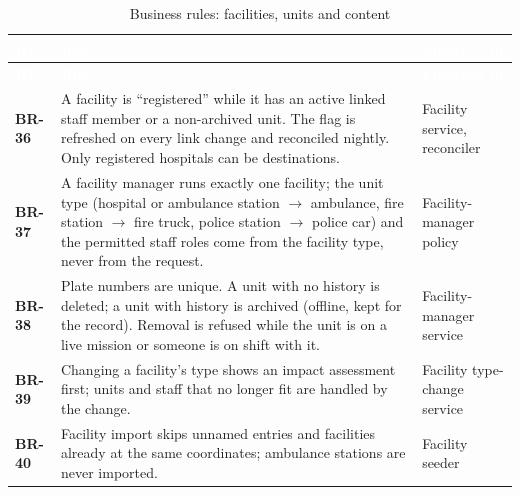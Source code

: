 {\tabfont\rowband
\begin{longtable}{@{}>{\raggedright\arraybackslash}p{}>{\raggedright\arraybackslash}p{}>{\raggedright\arraybackslash}p{}@{}}
\caption{Business rules: facilities, units and content}\label{tab:br-facilities}\\
\rowcolor{najdanavy}\textcolor{white}{\sffamily\bfseries\small ID} & \textcolor{white}{\sffamily\bfseries\small Rule} & \textcolor{white}{\sffamily\bfseries\small Enforced in}\\
\endfirsthead
\rowcolor{najdanavy}\textcolor{white}{\sffamily\bfseries\small ID} & \textcolor{white}{\sffamily\bfseries\small Rule} & \textcolor{white}{\sffamily\bfseries\small Enforced in}\\
\endhead
\bottomrule\endlastfoot
\textbf{BR-36} & A facility is “registered” while it has an active linked staff member or a non-archived unit. The flag is refreshed on every link change and reconciled nightly. Only registered hospitals can be destinations. & Facility service, reconciler\\
\textbf{BR-37} & A facility manager runs exactly one facility; the unit type (hospital or ambulance station $\rightarrow$ ambulance, fire station $\rightarrow$ fire truck, police station $\rightarrow$ police car) and the permitted staff roles come from the facility type, never from the request. & Facility-manager policy\\
\textbf{BR-38} & Plate numbers are unique. A unit with no history is deleted; a unit with history is archived (offline, kept for the record). Removal is refused while the unit is on a live mission or someone is on shift with it. & Facility-manager service\\
\textbf{BR-39} & Changing a facility’s type shows an impact assessment first; units and staff that no longer fit are handled by the change. & Facility type-change service\\
\textbf{BR-40} & Facility import skips unnamed entries and facilities already at the same coordinates; ambulance stations are never imported. & Facility seeder\\
\end{longtable}}
